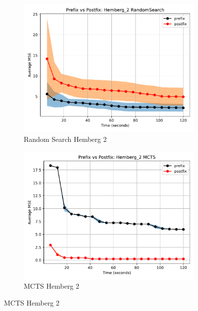 \documentclass[runningheads]{llncs}
\begin{document}
\begin{figure}
    \centering
    
    \begin{subfigure}[b]{0.4\textwidth}
        \includegraphics[width=\linewidth, keepaspectratio]{Hemberg_Benchmarks/PrePostHemberg_2RandomSearch.pdf}
        \caption{Random Search Hemberg 2}
        \label{subfig:hemberg_2_RS}
    \end{subfigure}
    \begin{subfigure}[b]{0.4\textwidth}
        \includegraphics[width=\linewidth, keepaspectratio]{Hemberg_Benchmarks/PrePostHemberg_2MCTS.pdf}
        \caption{MCTS Hemberg 2}
        \label{subfig:hemberg_2_MCTS}
    \end{subfigure}
    

\end{figure}
\end{document}
